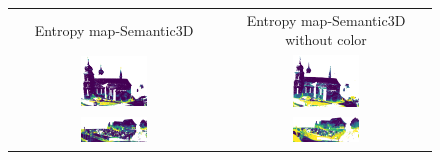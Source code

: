     \begin{figure}[h!]
        \centering
        \begin{tabular}{cc}
            Entropy map-Semantic3D & Entropy map-Semantic3D without color \\
            \includegraphics[width=0.33\textwidth, height=0.18\textheight]{images/ood_imgs/de_sem3d/de_ent_10_1.pdf}&
            \includegraphics[width=0.33\textwidth, height=0.18\textheight]{images/sem3d_of/de_ent_sem3d_of_1.pdf}\\

            \includegraphics[width=0.33\textwidth, height=0.18\textheight]{images/ood_imgs/de_sem3d/de_ent_10_2.pdf}&
            \includegraphics[width=0.33\textwidth, height=0.18\textheight]{images/sem3d_of/de_ent_sem3d_of_2.pdf}\\


\end{tabular}
\end{figure}
